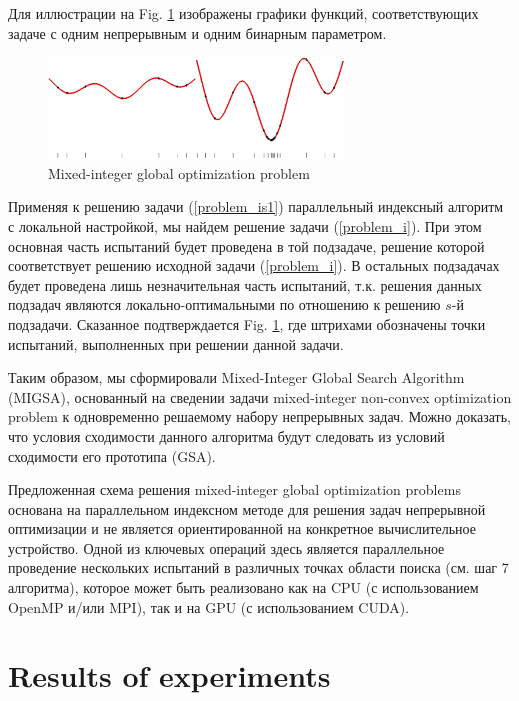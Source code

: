 \documentclass[
11pt,%
tightenlines,%
twoside,%
onecolumn,%
nofloats,%
nobibnotes,%
nofootinbib,%
superscriptaddress,%
noshowpacs,%
centertags]%
{revtex4}
\begin{document}
Для иллюстрации на Fig. \ref{fig:1}  изображены графики функций, соответствующих задаче с одним непрерывным и одним бинарным параметром.
\begin{figure}[ht]
    \centering
    \includegraphics[width=0.7\textwidth]{fig1.jpg}
    \caption{Mixed-integer global optimization problem}
    \label{fig:1}
\end{figure}

Применяя к решению задачи (\ref{problem_is1}) параллельный индексный алгоритм с локальной настройкой, мы найдем решение задачи (\ref{problem_i}). При этом основная часть испытаний будет проведена в той подзадаче, решение которой соответствует решению исходной задачи (\ref{problem_i}). В остальных подзадачах будет проведена лишь незначительная часть испытаний, т.к. решения данных подзадач являются локально-оптимальными по отношению к решению $s$-й подзадачи. Сказанное подтверждается Fig. \ref{fig:1}, где штрихами обозначены точки испытаний, выполненных при решении данной задачи.

Таким образом, мы сформировали Mixed-Integer Global Search Algorithm (MIGSA), основанный на сведении задачи mixed-integer non-convex optimization problem к одновременно решаемому набору непрерывных задач.
Можно доказать, что условия сходимости данного алгоритма будут следовать из условий сходимости его прототипа (GSA).

Предложенная схема решения mixed-integer global optimization problems основана на параллельном индексном методе для решения задач непрерывной оптимизации и не является ориентированной на конкретное вычислительное устройство. Одной из ключевых операций здесь является параллельное проведение нескольких испытаний в различных точках области поиска (см. шаг 7 алгоритма), которое может быть реализовано как на CPU (с использованием OpenMP и/или MPI), так и на GPU (с использованием CUDA).



\section{Results of experiments}
\end{document}
